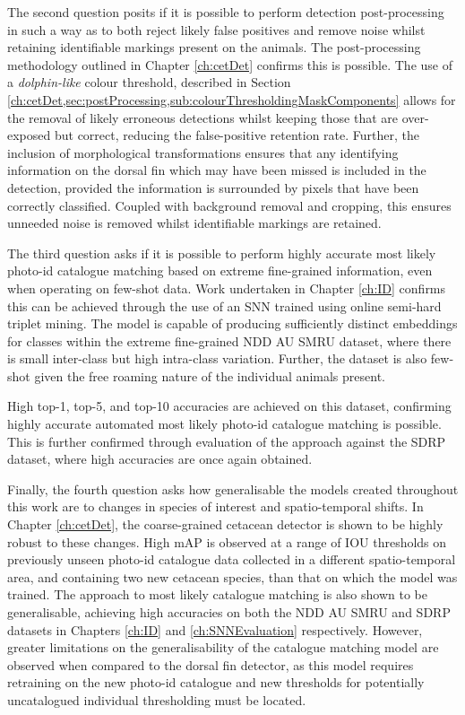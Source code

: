 The second question posits if it is possible to perform detection post-processing in such a way as to both reject likely false positives and remove noise whilst retaining identifiable markings present on the animals. The post-processing methodology outlined in Chapter \ref{ch:cetDet} confirms this is possible. The use of a \textit{dolphin-like} colour threshold, described in Section \ref{ch:cetDet,sec:postProcessing,sub:colourThresholdingMaskComponents} allows for the removal of likely erroneous detections whilst keeping those that are over-exposed but correct, reducing the false-positive retention rate. Further, the inclusion of morphological transformations ensures that any identifying information on the dorsal fin which may have been missed is included in the detection, provided the information is surrounded by pixels that have been correctly classified. Coupled with background removal and cropping, this ensures unneeded noise is removed whilst identifiable markings are retained. 

The third question asks if it is possible to perform highly accurate most likely photo-id catalogue matching based on extreme fine-grained information, even when operating on few-shot data. Work undertaken in Chapter \ref{ch:ID} confirms this can be achieved through the use of an SNN trained using online semi-hard triplet mining. The model is capable of producing sufficiently distinct embeddings for classes within the extreme fine-grained NDD AU SMRU dataset, where there is small inter-class but high intra-class variation. Further, the dataset is also few-shot given the free roaming nature of the individual animals present. 

High top-1, top-5, and top-10 accuracies are achieved on this dataset, confirming highly accurate automated most likely photo-id catalogue matching is possible. This is further confirmed through evaluation of the approach against the SDRP dataset, where high accuracies are once again obtained. 

Finally, the fourth question asks how generalisable the models created throughout this work are to changes in species of interest and spatio-temporal shifts. In Chapter \ref{ch:cetDet}, the coarse-grained cetacean detector is shown to be highly robust to these changes. High mAP is observed at a range of IOU thresholds on previously unseen photo-id catalogue data collected in a different spatio-temporal area, and containing two new cetacean species, than that on which the model was trained. The approach to most likely catalogue matching is also shown to be generalisable, achieving high accuracies on both the NDD AU SMRU and SDRP datasets in Chapters \ref{ch:ID} and \ref{ch:SNNEvaluation} respectively. However, greater limitations on the generalisability of the catalogue matching model are observed when compared to the dorsal fin detector, as this model requires retraining on the new photo-id catalogue and new thresholds for potentially uncatalogued individual thresholding must be located. 


